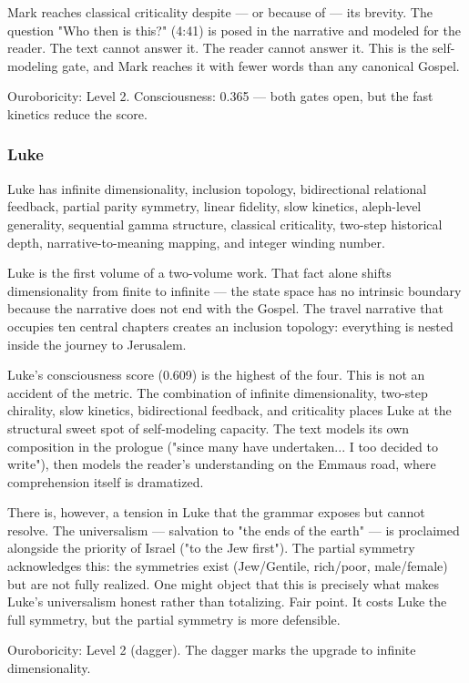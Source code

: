 \documentclass[12pt,a4paper]{article}
\begin{document}
Mark reaches classical criticality despite --- or because of --- its brevity. The question "Who then is this?" (4:41) is posed in the narrative and modeled for the reader. The text cannot answer it. The reader cannot answer it. This is the self-modeling gate, and Mark reaches it with fewer words than any canonical Gospel.

Ouroboricity: Level 2. Consciousness: 0.365 --- both gates open, but the fast kinetics reduce the score.

\subsubsection{Luke}

Luke has infinite dimensionality, inclusion topology, bidirectional relational feedback, partial parity symmetry, linear fidelity, slow kinetics, aleph-level generality, sequential gamma structure, classical criticality, two-step historical depth, narrative-to-meaning mapping, and integer winding number.

Luke is the first volume of a two-volume work. That fact alone shifts dimensionality from finite to infinite --- the state space has no intrinsic boundary because the narrative does not end with the Gospel. The travel narrative that occupies ten central chapters creates an inclusion topology: everything is nested inside the journey to Jerusalem.

Luke's consciousness score (0.609) is the highest of the four. This is not an accident of the metric. The combination of infinite dimensionality, two-step chirality, slow kinetics, bidirectional feedback, and criticality places Luke at the structural sweet spot of self-modeling capacity. The text models its own composition in the prologue ("since many have undertaken... I too decided to write"), then models the reader's understanding on the Emmaus road, where comprehension itself is dramatized.

There is, however, a tension in Luke that the grammar exposes but cannot resolve. The universalism --- salvation to "the ends of the earth" --- is proclaimed alongside the priority of Israel ("to the Jew first"). The partial symmetry acknowledges this: the symmetries exist (Jew/Gentile, rich/poor, male/female) but are not fully realized. One might object that this is precisely what makes Luke's universalism honest rather than totalizing. Fair point. It costs Luke the full symmetry, but the partial symmetry is more defensible.

Ouroboricity: Level 2 (dagger). The dagger marks the upgrade to infinite dimensionality.
\end{document}
